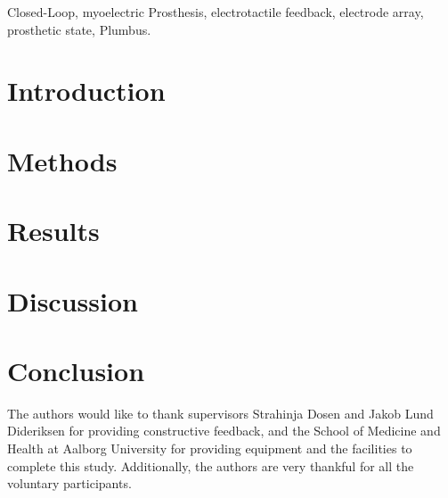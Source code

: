 \documentclass[journal]{IEEEtran}
\begin{document}
\begin{IEEEkeywords}
Closed-Loop, myoelectric Prosthesis, electrotactile feedback, electrode array, prosthetic state, Plumbus. 
\end{IEEEkeywords}

\IEEEpeerreviewmaketitle

\section{Introduction}
 

\section{Methods}























\section{Results}



\section{Discussion}


\section{Conclusion}


\appendix[Acknowledgement]
The authors would like to thank supervisors Strahinja Dosen and Jakob Lund Dideriksen for providing constructive feedback, and the School of Medicine and Health at Aalborg University for providing equipment and the facilities to complete this study. Additionally, the authors are very thankful for all the voluntary participants. 


\end{document}
